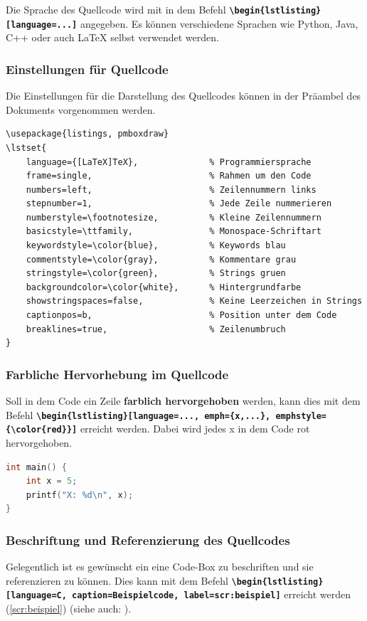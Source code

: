 Die Sprache des Quellcode wird mit in dem Befehl \textbf{\texttt{\textbackslash begin\{lstlisting\}[language=...]}} angegeben. Es können verschiedene Sprachen wie Python, Java, C++ oder auch \LaTeX{} selbst verwendet werden.

\subsubsection{Einstellungen für Quellcode}
Die Einstellungen für die Darstellung des Quellcodes können in der Präambel des Dokuments vorgenommen werden.

\begin{lstlisting}[language={[LaTeX]TeX}]
\usepackage{listings, pmboxdraw}
\lstset{
    language={[LaTeX]TeX},              % Programmiersprache
    frame=single,                       % Rahmen um den Code
    numbers=left,                       % Zeilennummern links
    stepnumber=1,                       % Jede Zeile nummerieren
    numberstyle=\footnotesize,          % Kleine Zeilennummern
    basicstyle=\ttfamily,               % Monospace-Schriftart
    keywordstyle=\color{blue},          % Keywords blau
    commentstyle=\color{gray},          % Kommentare grau
    stringstyle=\color{green},          % Strings gruen
    backgroundcolor=\color{white},      % Hintergrundfarbe
    showstringspaces=false,             % Keine Leerzeichen in Strings
    captionpos=b,                       % Position unter dem Code 
    breaklines=true,                    % Zeilenumbruch
}
\end{lstlisting}

\subsubsection{Farbliche Hervorhebung im Quellcode}
Soll in dem Code ein Zeile \textbf{farblich hervorgehoben} werden, kann dies mit dem Befehl \textbf{\texttt{\textbackslash begin\{lstlisting\}[language=..., emph=\{x,...\}, emphstyle=\{\textbackslash color\{red\}\}]}} erreicht werden. Dabei wird jedes x in dem Code rot hervorgehoben.

\begin{lstlisting}[language=C, emph={x}, emphstyle=\color{red}]
int main() {
    int x = 5;
    printf("X: %d\n", x);
}
\end{lstlisting}

\subsubsection{Beschriftung und Referenzierung des Quellcodes}
Gelegentlich ist es gewünscht ein eine Code-Box zu beschriften und sie referenzieren zu können. Dies kann mit dem Befehl \textbf{\texttt{\textbackslash begin\{lstlisting\}[language=C, caption=Beispielcode, label=scr:beispiel]}} erreicht werden (\autoref{scr:beispiel}) (siehe auch: ).

